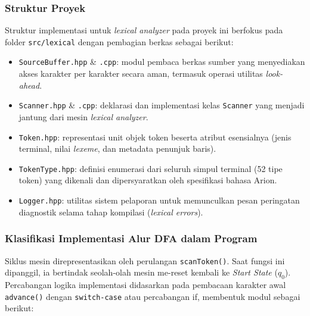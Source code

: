 \documentclass[12pt,a4paper]{article}
\begin{document}
\subsubsection{Struktur Proyek}

Struktur implementasi untuk \textit{lexical analyzer} pada proyek ini berfokus pada folder \texttt{src/lexical} dengan pembagian berkas sebagai berikut:
\begin{itemize}
  \item \texttt{SourceBuffer.hpp} \& \texttt{.cpp}: modul pembaca berkas sumber yang menyediakan akses karakter per karakter secara aman, termasuk operasi utilitas \textit{look-ahead}.
  \item \texttt{Scanner.hpp} \& \texttt{.cpp}: deklarasi dan implementasi kelas \texttt{Scanner} yang menjadi jantung dari mesin \textit{lexical analyzer}.
  \item \texttt{Token.hpp}: representasi unit objek token beserta atribut esensialnya (jenis terminal, nilai \textit{lexeme}, dan metadata penunjuk baris).
  \item \texttt{TokenType.hpp}: definisi enumerasi dari seluruh simpul terminal (52 tipe token) yang dikenali dan dipersyaratkan oleh spesifikasi bahasa Arion.
  \item \texttt{Logger.hpp}: utilitas sistem pelaporan untuk memunculkan pesan peringatan diagnostik selama tahap kompilasi (\textit{lexical errors}).
\end{itemize}

\subsubsection{Klasifikasi Implementasi Alur DFA dalam Program}

Siklus mesin direpresentasikan oleh perulangan \texttt{scanToken()}. Saat fungsi ini dipanggil, ia bertindak seolah-olah mesin me-reset kembali ke \textit{Start State} ($q_0$). Percabangan logika implementasi didasarkan pada pembacaan karakter awal \texttt{advance()} dengan \texttt{switch-case} atau percabangan if, membentuk modul sebagai berikut:
\end{document}
